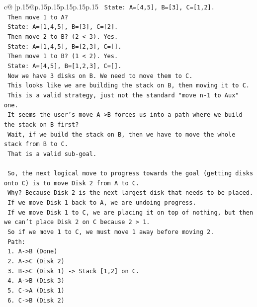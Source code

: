 \documentclass{article}
\begin{document}
{\begin{supertabular}{c@{$\;$}|p{.15\linewidth}@{}p{.15\linewidth}p{.15\linewidth}p{.15\linewidth}p{.15\linewidth}p{.15\linewidth}}
{{{\texttt{    State: A={[}4,5{]}, B={[}3{]}, C={[}1,2{]}.} \\
\texttt{    Then move 1 to A?} \\
\texttt{    State: A={[}1,4,5{]}, B={[}3{]}, C={[}2{]}.} \\
\texttt{    Then move 2 to B? (2 < 3). Yes.} \\
\texttt{    State: A={[}1,4,5{]}, B={[}2,3{]}, C={[}{]}.} \\
\texttt{    Then move 1 to B? (1 < 2). Yes.} \\
\texttt{    State: A={[}4,5{]}, B={[}1,2,3{]}, C={[}{]}.} \\
\texttt{    Now we have 3 disks on B. We need to move them to C.} \\
\texttt{    This looks like we are building the stack on B, then moving it to C.} \\
\texttt{    This is a valid strategy, just not the standard "move n{-}1 to Aux" one.} \\
\texttt{    It seems the user's move A{-}>B forces us into a path where we build the stack on B first?} \\
\texttt{    Wait, if we build the stack on B, then we have to move the whole stack from B to C.} \\
\texttt{    That is a valid sub{-}goal.} \\
\\ 
\texttt{    So, the next logical move to progress towards the goal (getting disks onto C) is to move Disk 2 from A to C.} \\
\texttt{    Why? Because Disk 2 is the next largest disk that needs to be placed.} \\
\texttt{    If we move Disk 1 back to A, we are undoing progress.} \\
\texttt{    If we move Disk 1 to C, we are placing it on top of nothing, but then we can't place Disk 2 on C because 2 > 1.} \\
\texttt{    So if we move 1 to C, we must move 1 away before moving 2.} \\
\texttt{    Path:} \\
\texttt{    1. A{-}>B (Done)} \\
\texttt{    2. A{-}>C (Disk 2)} \\
\texttt{    3. B{-}>C (Disk 1) {-}> Stack {[}1,2{]} on C.} \\
\texttt{    4. A{-}>B (Disk 3)} \\
\texttt{    5. C{-}>A (Disk 1)} \\
\texttt{    6. C{-}>B (Disk 2)} \\
}}}
\end{supertabular}}
\end{document}
